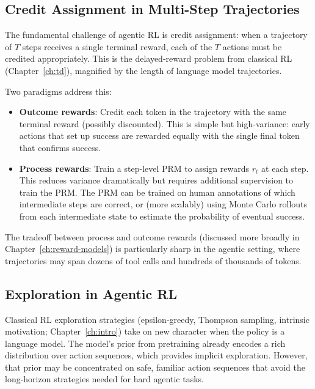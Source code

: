 \subsection{Credit Assignment in Multi-Step Trajectories}
\label{subsec:credit-agentic}

The fundamental challenge of agentic RL
is credit assignment: when a trajectory of $T$ steps receives a single
terminal reward, each of the $T$ actions must be credited appropriately.
This is the delayed-reward problem from classical RL
(Chapter~\ref{ch:td}), magnified by the length of language model
trajectories.

Two paradigms address this:

\begin{itemize}[leftmargin=*]
\item \textbf{Outcome rewards}: Credit each token in the trajectory
  with the same terminal reward (possibly discounted). This is simple
  but high-variance: early actions that set up success are rewarded
  equally with the single final token that confirms success.

\item \textbf{Process rewards}: Train a step-level PRM to assign
  rewards $r_t$ at each step. This reduces variance dramatically
  but requires additional supervision to train the PRM. The PRM can
  be trained on human annotations of which intermediate steps are
  correct, or (more scalably) using Monte Carlo rollouts from each
  intermediate state to estimate the probability of eventual success.
\end{itemize}

The tradeoff between process and outcome rewards (discussed more
broadly in Chapter~\ref{ch:reward-models}) is particularly sharp in
the agentic setting, where trajectories may span dozens of tool calls
and hundreds of thousands of tokens.

\subsection{Exploration in Agentic RL}
\label{subsec:agentic-exploration}

Classical RL exploration strategies (epsilon-greedy, Thompson
sampling, intrinsic motivation; Chapter~\ref{ch:intro}) take on new
character when the policy is a language model. The model's prior from
pretraining already encodes a rich distribution over action sequences,
which provides implicit exploration. However, that prior may be
concentrated on safe, familiar action sequences that avoid the
long-horizon strategies needed for hard agentic tasks.


